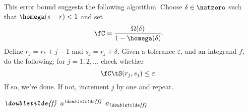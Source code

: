 \documentclass[]{elsarticle}
\newcommand{\fudge}{\fC}
\newcommand{\dtf}{\textit{\doubletilde{f}}}
\begin{document}
This error bound suggests the following algorithm.  Choose $\delta \in \natzero$ such that $\homega(s-r)<1$ and set 
\[
\fudge = \frac{\Omega(\delta)}{1 - \homega(\delta)}.
\]
Define $r_j=r_*+j-1$ and $s_j=r_j+\delta$.  Given a tolerance $\varepsilon$, and an integrand $f$, do the following:  for $j=1, 2, \ldots$ check whether
\[
\fudge \tS(r_j,s_j) \le \varepsilon.
\]
If so, we're done.  If not, increment $j$ by one and repeat.


$\dtf$ $a^{\dtf}$ $a_{\dtf}$


\end{document}
